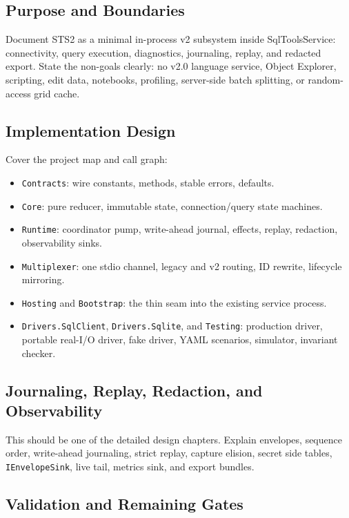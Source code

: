 \documentclass[11pt]{article}
\newcommand{\code}[1]{\texttt{#1}}
\begin{document}
\subsection{Purpose and Boundaries}

Document STS2 as a minimal in-process v2 subsystem inside SqlToolsService: connectivity, query execution, diagnostics, journaling, replay, and redacted export.  State the non-goals clearly: no v2.0 language service, Object Explorer, scripting, edit data, notebooks, profiling, server-side batch splitting, or random-access grid cache.

\subsection{Implementation Design}

Cover the project map and call graph:

\begin{itemize}
	\item \code{Contracts}: wire constants, methods, stable errors, defaults.
	\item \code{Core}: pure reducer, immutable state, connection/query state machines.
	\item \code{Runtime}: coordinator pump, write-ahead journal, effects, replay, redaction, observability sinks.
	\item \code{Multiplexer}: one stdio channel, legacy and v2 routing, ID rewrite, lifecycle mirroring.
	\item \code{Hosting} and \code{Bootstrap}: the thin seam into the existing service process.
	\item \code{Drivers.SqlClient}, \code{Drivers.Sqlite}, and \code{Testing}: production driver, portable real-I/O driver, fake driver, YAML scenarios, simulator, invariant checker.
\end{itemize}

\subsection{Journaling, Replay, Redaction, and Observability}

This should be one of the detailed design chapters.  Explain envelopes, sequence order, write-ahead journaling, strict replay, capture elision, secret side tables, \code{IEnvelopeSink}, live tail, metrics sink, and export bundles.

\subsection{Validation and Remaining Gates}
\end{document}
